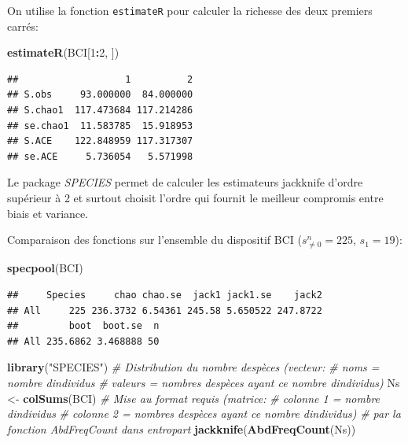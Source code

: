 \documentclass[
  11pt,
  french,
  a4paper,
  extrafontsizes,onecolumn,openright
  ]{memoir}
\newenvironment{Shaded}{\begin{snugshade}}{\end{snugshade}}
\newcommand{\CommentTok}[1]{\textcolor[rgb]{0.56,0.35,0.01}{\textit{#1}}}
\newcommand{\DecValTok}[1]{\textcolor[rgb]{0.00,0.00,0.81}{#1}}
\newcommand{\FunctionTok}[1]{\textcolor[rgb]{0.13,0.29,0.53}{\textbf{#1}}}
\newcommand{\NormalTok}[1]{#1}
\newcommand{\OtherTok}[1]{\textcolor[rgb]{0.56,0.35,0.01}{#1}}
\newcommand{\SpecialCharTok}[1]{\textcolor[rgb]{0.81,0.36,0.00}{\textbf{#1}}}
\newcommand{\StringTok}[1]{\textcolor[rgb]{0.31,0.60,0.02}{#1}}
\begin{document}
\normalsize

On utilise la fonction \texttt{estimateR} pour calculer la richesse des deux premiers carrés:

\scriptsize

\begin{Shaded}
\begin{Highlighting}[]
\FunctionTok{estimateR}\NormalTok{(BCI[}\DecValTok{1}\SpecialCharTok{:}\DecValTok{2}\NormalTok{, ])}
\end{Highlighting}
\end{Shaded}

\begin{verbatim}
##                   1          2
## S.obs     93.000000  84.000000
## S.chao1  117.473684 117.214286
## se.chao1  11.583785  15.918953
## S.ACE    122.848959 117.317307
## se.ACE     5.736054   5.571998
\end{verbatim}

\normalsize

Le package \emph{SPECIES} \autocite{Wang2011} permet de calculer les estimateurs jackknife d'ordre supérieur à 2 et surtout choisit l'ordre qui fournit le meilleur compromis entre biais et variance.

Comparaison des fonctions sur l'ensemble du dispositif BCI (\(s^{n}_{\ne 0}=225\), \(s_{1}=19\)):

\scriptsize

\begin{Shaded}
\begin{Highlighting}[]
\FunctionTok{specpool}\NormalTok{(BCI)}
\end{Highlighting}
\end{Shaded}

\begin{verbatim}
##     Species     chao chao.se  jack1 jack1.se    jack2
## All     225 236.3732 6.54361 245.58 5.650522 247.8722
##         boot  boot.se  n
## All 235.6862 3.468888 50
\end{verbatim}

\begin{Shaded}
\begin{Highlighting}[]
\FunctionTok{library}\NormalTok{(}\StringTok{"SPECIES"}\NormalTok{)}
\CommentTok{\# Distribution du nombre d\textquotesingle{}espèces (vecteur: }
\CommentTok{\# noms = nombre d\textquotesingle{}individus}
\CommentTok{\# valeurs = nombres d\textquotesingle{}espèces ayant ce nombre d\textquotesingle{}individus)}
\NormalTok{Ns }\OtherTok{\textless{}{-}} \FunctionTok{colSums}\NormalTok{(BCI)}
\CommentTok{\# Mise au format requis (matrice:}
\CommentTok{\# colonne 1 = nombre d\textquotesingle{}individus}
\CommentTok{\# colonne 2 = nombres d\textquotesingle{}espèces ayant ce nombre d\textquotesingle{}individus)}
\CommentTok{\# par la fonction AbdFreqCount dans entropart}
\FunctionTok{jackknife}\NormalTok{(}\FunctionTok{AbdFreqCount}\NormalTok{(Ns))}
\end{Highlighting}
\end{Shaded}
\end{document}
